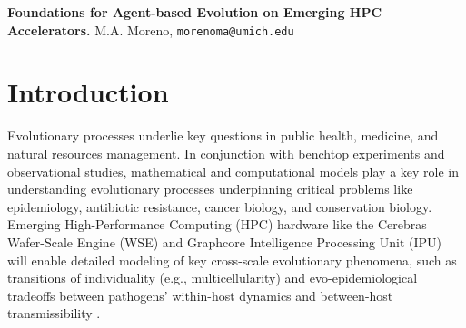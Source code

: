 

\noindent
\textbf{Foundations for Agent-based Evolution on Emerging HPC Accelerators.}
M.A. Moreno, \texttt{morenoma@umich.edu}

\section{Introduction}
Evolutionary processes underlie key questions in public health, medicine, and natural resources management.
In conjunction with benchtop experiments and observational studies, mathematical and computational models play a key role in understanding evolutionary processes underpinning critical problems like epidemiology, antibiotic resistance, cancer biology, and conservation biology.
Emerging High-Performance Computing (HPC) hardware like the Cerebras Wafer-Scale Engine (WSE) and Graphcore Intelligence Processing Unit (IPU) will enable detailed modeling of key cross-scale evolutionary phenomena, such as transitions of individuality (e.g., multicellularity) and evo-epidemiological tradeoffs between pathogens' within-host dynamics and between-host transmissibility \cite{goldsby2020major,schreiber2021evolutionary}.

